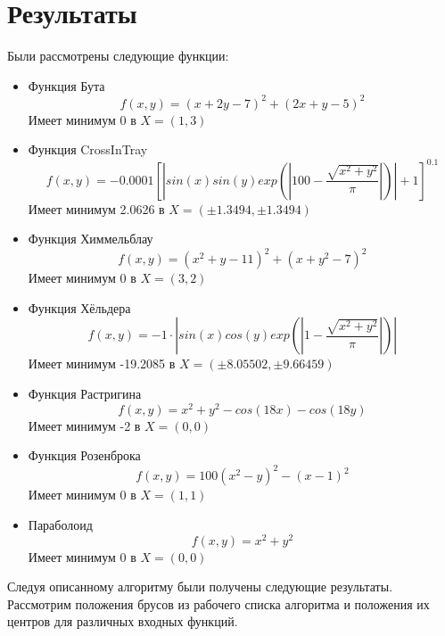 \documentclass[a4paper]{article}
\begin{document}
\section{Результаты}
Были рассмотрены следующие функции:
\begin{itemize}
    \item Функция Бута
    \begin{equation*}
        f(x, y) = (x + 2y − 7)^2 + (2x + y − 5)^2
    \end{equation*}
    Имеет минимум 0 в $X = (1, 3)$
    \item Функция CrossInTray
    \begin{equation*}
        f(x, y) = -0.0001[|sin(x)sin(y)exp(|100 - \frac{\sqrt{x^2+y^2}}{\pi}|)|+1]^{0.1}
    \end{equation*}
    Имеет минимум 2.0626 в $X = (\pm 1.3494, \pm 1.3494)$
    \item Функция Химмельблау
    \begin{equation*}
        f(x, y) = (x^2 + y - 11)^2 + (x + y^2 - 7)^2
    \end{equation*}
    Имеет минимум 0 в $X = (3, 2)$
    \item Функция Хёльдера
    \begin{equation*}
        f(x, y) = -1 \cdot |sin(x)cos(y) exp(|1 -\frac{\sqrt{x^2+y^2}}{\pi}|)|
    \end{equation*}
    Имеет минимум -19.2085 в  $X = (\pm 8.05502, \pm 9.66459)$
    \item Функция Растригина
    \begin{equation*}
        f(x, y) = x^2 + y^2 - cos(18x) - cos(18y)
    \end{equation*}
    Имеет минимум -2 в $X = (0, 0)$
    \item Функция Розенброка
    \begin{equation*}
        f(x, y) = 100 (x^2 - y)^2 - (x - 1)^2
    \end{equation*}
    Имеет минимум 0 в $X = (1, 1)$
    \item Параболоид
    \begin{equation*}
        f(x, y) = x^2 + y^2
    \end{equation*}
    Имеет минимум 0 в $X = (0, 0)$
\end{itemize}
Следуя описанному алгоритму были получены следующие результаты. \\
\newpage
Рассмотрим положения брусов из рабочего списка алгоритма и положения их центров для различных входных функций. 
\end{document}
